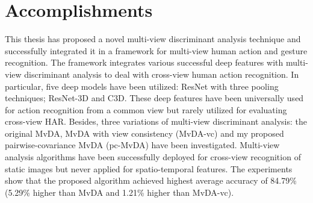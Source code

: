 
\section{Accomplishments}
    This thesis has proposed a novel multi-view discriminant analysis technique and successfully integrated it in a framework for multi-view human action and gesture recognition.
    The framework integrates various successful deep features with multi-view discriminant analysis to deal with cross-view human action recognition.
    In particular, five deep models have been utilized: ResNet with three pooling techniques; ResNet-3D and C3D.
    These deep features have been universally used for action recognition from a common view but rarely utilized for evaluating cross-view HAR.
    Besides, three variations of multi-view discriminant analysis: the original MvDA, MvDA with view consistency (MvDA-vc) and my proposed pairwise-covariance MvDA (pc-MvDA) have been investigated.
    Multi-view analysis algorithms have been successfully deployed for cross-view recognition of static images but never applied for spatio-temporal features.
    The experiments show that the proposed algorithm achieved highest average accuracy of 84.79\% (5.29\% higher than MvDA and 1.21\% higher than MvDA-vc).
